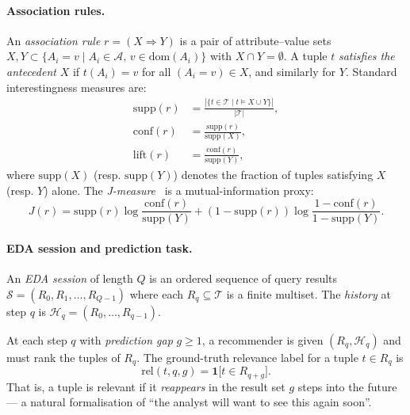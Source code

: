 \paragraph{Association rules.}
An \emph{association rule} $r = (X \Rightarrow Y)$ is a pair of attribute–value
sets $X, Y \subset \{A_i = v \mid A_i \in \mathcal{A},\, v \in \text{dom}(A_i)\}$
with $X \cap Y = \emptyset$.  A tuple $t$ \emph{satisfies the antecedent} $X$
if $t(A_i) = v$ for all $(A_i = v) \in X$, and similarly for $Y$.  Standard
interestingness measures are:
\begin{align}
  \text{supp}(r) &= \frac{|\{t \in \mathcal{T} \mid t \models X \cup Y\}|}{|\mathcal{T}|},
  \label{eq:support}\\
  \text{conf}(r) &= \frac{\text{supp}(r)}{\text{supp}(X)},
  \label{eq:confidence}\\
  \text{lift}(r) &= \frac{\text{conf}(r)}{\text{supp}(Y)},
  \label{eq:lift}
\end{align}
where $\text{supp}(X)$ (resp. $\text{supp}(Y)$) denotes the fraction of tuples
satisfying $X$ (resp. $Y$) alone.  The \emph{J-measure}~\cite{goodman1991rule}
is a mutual-information proxy:
\begin{equation}
  J(r) = \text{supp}(r)\log\frac{\text{conf}(r)}{\text{supp}(Y)}
        + (1-\text{supp}(r))\log\frac{1-\text{conf}(r)}{1-\text{supp}(Y)}.
  \label{eq:jmeasure}
\end{equation}

\paragraph{EDA session and prediction task.}
An \emph{EDA session} of length $Q$ is an ordered sequence of query results
$\mathcal{S} = (R_0, R_1, \ldots, R_{Q-1})$ where each $R_q \subseteq \mathcal{T}$
is a finite multiset.  The \emph{history} at step $q$ is
$\mathcal{H}_q = (R_0, \ldots, R_{q-1})$.

At each step $q$ with \emph{prediction gap} $g \geq 1$, a recommender is given
$(R_q, \mathcal{H}_q)$ and must rank the tuples of $R_q$.  The ground-truth
relevance label for a tuple $t \in R_q$ is
\begin{equation}
  \text{rel}(t,q,g) = \mathbf{1}\bigl[t \in R_{q+g}\bigr].
  \label{eq:relevance}
\end{equation}
That is, a tuple is relevant if it \emph{reappears} in the result set $g$ steps
into the future --- a natural formalisation of ``the analyst will want to see
this again soon''.

